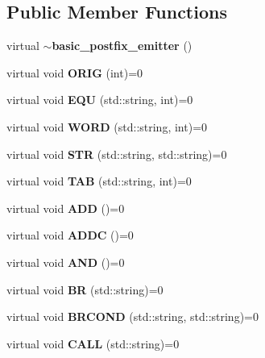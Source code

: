 \subsection*{Public Member Functions}
\begin{DoxyCompactItemize}
\item 
virtual {\bf $\sim$basic\+\_\+postfix\+\_\+emitter} ()
\item 
virtual void {\bfseries O\+R\+I\+G} (int)=0\label{classcdk_1_1basic__postfix__emitter_af66165e8f4e5a0fe4bf077bfe3e9611c}

\item 
virtual void {\bfseries E\+Q\+U} (std\+::string, int)=0\label{classcdk_1_1basic__postfix__emitter_ae7488e587652910e45409f82be277402}

\item 
virtual void {\bfseries W\+O\+R\+D} (std\+::string, int)=0\label{classcdk_1_1basic__postfix__emitter_a0beb8e87e629adf3ab248ec8c122f2a9}

\item 
virtual void {\bfseries S\+T\+R} (std\+::string, std\+::string)=0\label{classcdk_1_1basic__postfix__emitter_a561510fb8b3ebd8d7d7f5e07255c374d}

\item 
virtual void {\bfseries T\+A\+B} (std\+::string, int)=0\label{classcdk_1_1basic__postfix__emitter_adfc8362edf35b90a2a06d5db3e38a40e}

\item 
virtual void {\bfseries A\+D\+D} ()=0\label{classcdk_1_1basic__postfix__emitter_a166a0afe31c5b1249b45c8f909bad6a1}

\item 
virtual void {\bfseries A\+D\+D\+C} ()=0\label{classcdk_1_1basic__postfix__emitter_ad2fb5791a8a36c00d807efd85ba7508d}

\item 
virtual void {\bfseries A\+N\+D} ()=0\label{classcdk_1_1basic__postfix__emitter_a0e1eed9bc80ca1ace031793aeca088d2}

\item 
virtual void {\bfseries B\+R} (std\+::string)=0\label{classcdk_1_1basic__postfix__emitter_a8f6b549211dd46dd6edb74166beccaee}

\item 
virtual void {\bfseries B\+R\+C\+O\+N\+D} (std\+::string, std\+::string)=0\label{classcdk_1_1basic__postfix__emitter_afbfe6647474a3338bec171b44ac2728b}

\item 
virtual void {\bfseries C\+A\+L\+L} (std\+::string)=0\label{classcdk_1_1basic__postfix__emitter_afce2babf830192bb7c008202d94c0b1e}


\end{DoxyCompactItemize}
